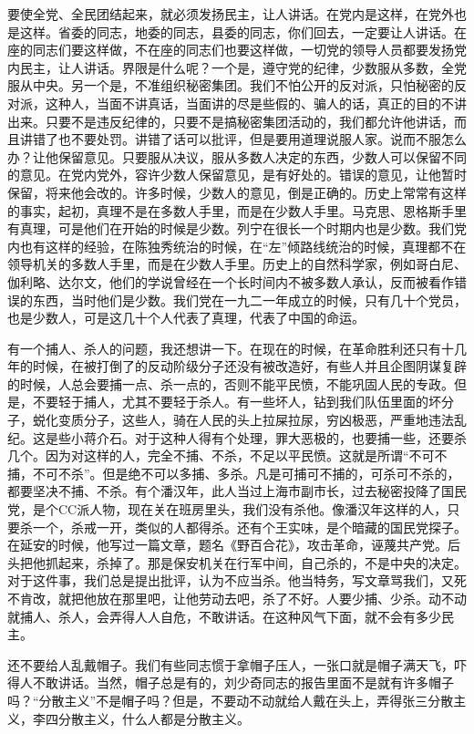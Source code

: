 要使全党、全民团结起来，就必须发扬民主，让人讲话。在党内是这样，在党外也是这样。省委的同志，地委的同志，县委的同志，你们回去，一定要让人讲话。在座的同志们要这样做，不在座的同志们也要这样做，一切党的领导人员都要发扬党内民主，让人讲话。界限是什么呢？一个是，遵守党的纪律，少数服从多数，全党服从中央。另一个是，不准组织秘密集团。我们不怕公开的反对派，只怕秘密的反对派，这种人，当面不讲真话，当面讲的尽是些假的、骗人的话，真正的目的不讲出来。只要不是违反纪律的，只要不是搞秘密集团活动的，我们都允许他讲话，而且讲错了也不要处罚。讲错了话可以批评，但是要用道理说服人家。说而不服怎么办？让他保留意见。只要服从决议，服从多数人决定的东西，少数人可以保留不同的意见。在党内党外，容许少数人保留意见，是有好处的。错误的意见，让他暂时保留，将来他会改的。许多时候，少数人的意见，倒是正确的。历史上常常有这样的事实，起初，真理不是在多数人手里，而是在少数人手里。马克思、恩格斯手里有真理，可是他们在开始的时候是少数。列宁在很长一个时期内也是少数。我们党内也有这样的经验，在陈独秀统治的时候，在“左”倾路线统治的时候，真理都不在领导机关的多数人手里，而是在少数人手里。历史上的自然科学家，例如哥白尼、伽利略、达尔文，他们的学说曾经在一个长时间内不被多数人承认，反而被看作错误的东西，当时他们是少数。我们党在一九二一年成立的时候，只有几十个党员，也是少数人，可是这几十个人代表了真理，代表了中国的命运。

有一个捕人、杀人的问题，我还想讲一下。在现在的时候，在革命胜利还只有十几年的时候，在被打倒了的反动阶级分子还没有被改造好，有些人并且企图阴谋复辟的时候，人总会要捕一点、杀一点的，否则不能平民愤，不能巩固人民的专政。但是，不要轻于捕人，尤其不要轻于杀人。有一些坏人，钻到我们队伍里面的坏分子，蜕化变质分子，这些人，骑在人民的头上拉屎拉尿，穷凶极恶，严重地违法乱纪。这是些小蒋介石。对于这种人得有个处理，罪大恶极的，也要捕一些，还要杀几个。因为对这样的人，完全不捕、不杀，不足以平民愤。这就是所谓“不可不捕，不可不杀”。但是绝不可以多捕、多杀。凡是可捕可不捕的，可杀可不杀的，都要坚决不捕、不杀。有个潘汉年，此人当过上海市副市长，过去秘密投降了国民党，是个CC派人物，现在关在班房里头，我们没有杀他。像潘汉年这样的人，只要杀一个，杀戒一开，类似的人都得杀。还有个王实味，是个暗藏的国民党探子。在延安的时候，他写过一篇文章，题名《野百合花》，攻击革命，诬蔑共产党。后头把他抓起来，杀掉了。那是保安机关在行军中间，自己杀的，不是中央的决定。对于这件事，我们总是提出批评，认为不应当杀。他当特务，写文章骂我们，又死不肯改，就把他放在那里吧，让他劳动去吧，杀了不好。人要少捕、少杀。动不动就捕人、杀人，会弄得人人自危，不敢讲话。在这种风气下面，就不会有多少民主。

还不要给人乱戴帽子。我们有些同志惯于拿帽子压人，一张口就是帽子满天飞，吓得人不敢讲话。当然，帽子总是有的，刘少奇同志的报告里面不是就有许多帽子吗？“分散主义”不是帽子吗？但是，不要动不动就给人戴在头上，弄得张三分散主义，李四分散主义，什么人都是分散主义。

